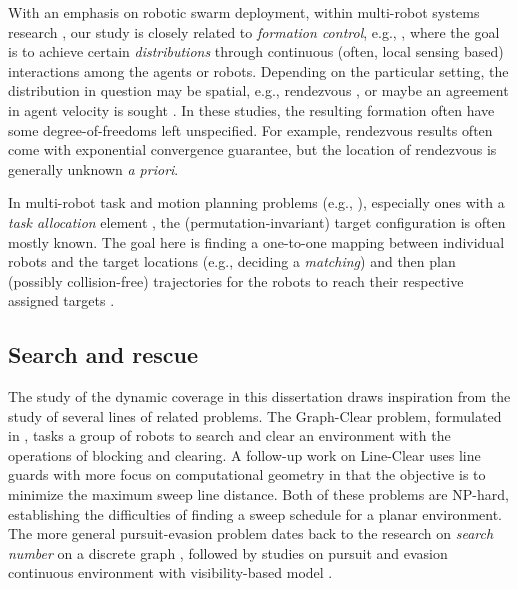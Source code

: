 With an emphasis on robotic swarm deployment, within multi-robot 
systems research \cite{arai2002advances,gerkey2004formal,ren2008distributed,bullo2009distributed}, 
our study is closely related to {\em formation control}, e.g., 
\cite{ando1999distributed,jadbabaie2003coordination,olfati2004consensus,ren2005consensus,cheng2008almost,mesbahi2010graph,yu2012rendezvous},
where the goal is to achieve certain {\em distributions} through 
continuous (often, local sensing based) interactions among the 
agents or robots. Depending on the particular setting, the 
distribution in question may be spatial, e.g., rendezvous
\cite{ando1999distributed,yu2012rendezvous}, or maybe an agreement 
in agent velocity is sought \cite{jadbabaie2003coordination,ren2005consensus}. 
In these studies, the resulting formation often have some 
degree-of-freedoms left unspecified. For example, rendezvous 
results \cite{ando1999distributed,yu2012rendezvous} often come 
with exponential convergence guarantee, but the location of
rendezvous is generally unknown {\em a priori}. 

In multi-robot task and motion planning problems (e.g.,
\cite{smith2009monotonic,ayanian2010decentralized,liu2011multi,liu2013optimal,turpin2014goal,turpin2014capt,alonso2015multi,SolYu15}), 
especially ones with a {\em task allocation} element 
\cite{smith2009monotonic,liu2011multi,liu2013optimal,turpin2014goal,turpin2014capt,SolYu15},
the (permutation-invariant) target configuration is often mostly 
known. The goal here is finding a one-to-one mapping between individual 
robots and the target locations (e.g., deciding a {\em matching}) and 
then plan (possibly collision-free) trajectories for the robots to reach 
their respective assigned targets \cite{turpin2014goal,turpin2014capt,SolYu15}.  

\subsection{Search and rescue}
The study of the dynamic coverage in this dissertation draws inspiration from the study of several 
lines of related problems. 
The Graph-Clear problem, formulated in \cite{kolling2007graph}, tasks a group of robots to search and clear an environment with the operations of blocking and clearing.
A follow-up work on Line-Clear \cite{kolling2017coordinated} uses line guards
with more focus on computational geometry in that
the objective is to minimize the maximum sweep line distance. Both of these problems are
NP-hard, establishing the difficulties of finding a sweep schedule for a planar environment.
The more general pursuit-evasion problem dates back to the research on \emph{search number}
on a discrete graph \cite{megiddo1988complexity}, 
followed by studies on pursuit and evasion continuous environment with 
visibility-based model \cite{guibas1999visibility, suzuki1992searching, lavalle2000algorithm, stiffler2017persistent}. 

